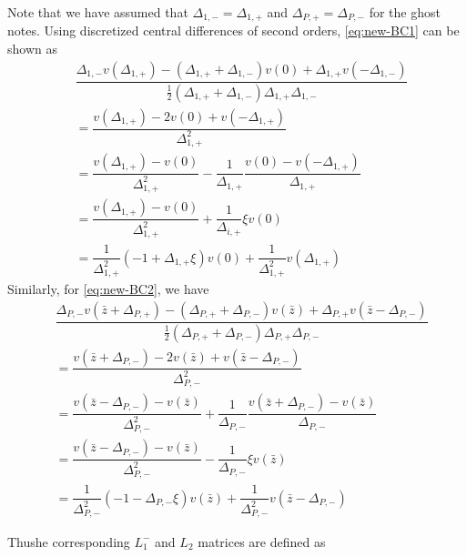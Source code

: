 \documentclass[11pt]{article}
\begin{document}
Note that we have assumed that $\Delta_{1,-} = \Delta_{1,+}$ and $\Delta_{P,+} = \Delta_{P,-}$ for the ghost notes. Using discretized central differences of second orders, \eqref{eq:new-BC1} can be shown as
\begin{align}
&\dfrac{\Delta_{1,-} v( \Delta_{1,+}) - (\Delta_{1,+} + \Delta_{1,-}) v( 0 ) + \Delta_{1,+}  v( - \Delta_{1,-})}{\frac{1}{2}(\Delta_{1,+} + \Delta_{1,-}) \Delta_{1,+} \Delta_{1,-} } \\
&=
\dfrac{v (\Delta_{1, +}) - 2 v(0) + v(-\Delta_{1, +})}{\Delta_{1, +}^2} \\ &= \dfrac{v(\Delta_{1, +}) - v(0)}{\Delta_{1, +}^2} - \dfrac{1}{\Delta_{1, +}}\dfrac{v (0) - v(-\Delta_{1, +}) }{\Delta_{1, +}}  \\
&= \dfrac{v(\Delta_{1, +}) - v(0)}{\Delta_{1, +}^2} + \dfrac{1}{\Delta_{i,+}} \xi v(0)  \\ 
&= \dfrac{1}{\Delta_{1, +}^2}  (- 1 + \Delta_{1, +} \xi) v(0)  + \dfrac{1}{\Delta_{1, +}^2}  v(\Delta_{1, +})  
\end{align}
Similarly, for \eqref{eq:new-BC2}, we have
\begin{align}
&\dfrac{\Delta_{P,-} v( \bar{z} + \Delta_{P,+}) - (\Delta_{P,+} + \Delta_{P,-}) v(\bar{z} ) + \Delta_{P,+}  v( \bar{z} - \Delta_{P,-})}{\frac{1}{2}(\Delta_{P,+} + \Delta_{P,-}) \Delta_{P,+} \Delta_{P,-} } \\
&=\dfrac{v (\bar{z} + \Delta_{P,-}) - 2 v(\bar{z} ) + v(\bar{z} -\Delta_{P,-})}{\Delta_{P,-}^2} \\
&=   \dfrac{v(\bar{z} - \Delta_{P,-}) - v(\bar{z})}{\Delta_{P,-}^2} + \dfrac{1}{\Delta_{P,-}}\dfrac{ v(\bar{z}+\Delta_{P,-}) - v (\bar{z}) }{\Delta_{P,-}}  \\
&= \dfrac{v(\bar{z} - \Delta_{P,-}) - v(\bar{z})}{\Delta_{P,-}^2}  - \dfrac{1}{\Delta_{P,-}} \xi v(\bar{z})  \\ 
&= \dfrac{1}{\Delta_{P,-}^2}  (- 1 - \Delta_{P,-} \xi) v(\bar{z})  + \dfrac{1}{\Delta_{P,-}^2}  v(\bar{z} - \Delta_{P,-})  
\end{align}

Thushe corresponding $L_1^{-}$ and $L_2$ matrices are defined as 
\end{document}
